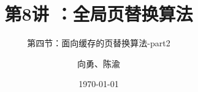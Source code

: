 



\title[第8讲]{第8讲 ：全局页替换算法} %
\subtitle{第四节：面向缓存的页替换算法-part2}
\author{向勇、陈渝} %
\date{\today} %




\begin{frame}
\titlepage %
\end{frame}

%

